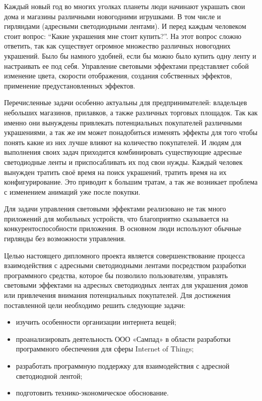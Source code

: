 \label{sec:introduction}

Каждый новый год во многих уголках планеты люди начинают украшать свои дома и магазины различными новогодними игрушками. В том числе и гирляндами (адресными светодиодными лентами). И перед каждым человеком стоит вопрос: \enquote{Какие украшения мне стоит купить?}. На этот вопрос сложно ответить, так как существует огромное множество различных новогодних украшений. Было бы намного удобней, если бы можно было купить одну ленту и настраивать ее под себя. Управление световыми эффектами представляет собой изменение цвета, скорости отображения, создания собственных эффектов, применение предустановленных эффектов.

Перечисленные задачи особенно актуальны для предпринимателей: владельцев небольших магазинов, прилавков, а также различных торговых площадок. Так как именно они вынуждены привлекать потенциальных покупателей различными украшениями, а так же им может понадобиться изменять эффекты для того чтобы понять какие из них лучше влияют на количество покупателей. И людям для выполнения своих задач приходится комбинировать существующие адресные светодиодные ленты и приспосабливать их под свои нужды. Каждый человек вынужден тратить своё время на поиск украшений, тратить время на их конфигурирование. Это приводит к большим тратам, а так же возникает проблема с изменением анимаций уже после покупки.

Для задачи управления световыми эффектами реализовано не так много приложений для мобильных устройств, что благоприятно сказывается на конкурентоспособности приложения. В основном люди используют обычные гирлянды без возможности управления.

Целью настоящего дипломного проекта является совершенствование процесса взаимодействия с адресными светодиодными лентами посредством разработки программного средства, которое бы позволило пользователям, управлять световыми эффектами на адресных светодиодных лентах для украшения домов или привлечения внимания потенциальных покупателей. Для достижения поставленной цели необходимо решить следующие задачи:
\begin{itemize}
\item изучить особенности организации интернета вещей;
\item проанализировать деятельность ООО «Сампад» в области разработки программного обеспечения для сферы Internet of Things;
\item разработать программную поддержку для взаимодействия с адресной светодиодной лентой;
\item подготовить технико-экономическое обоснование.
\end{itemize}